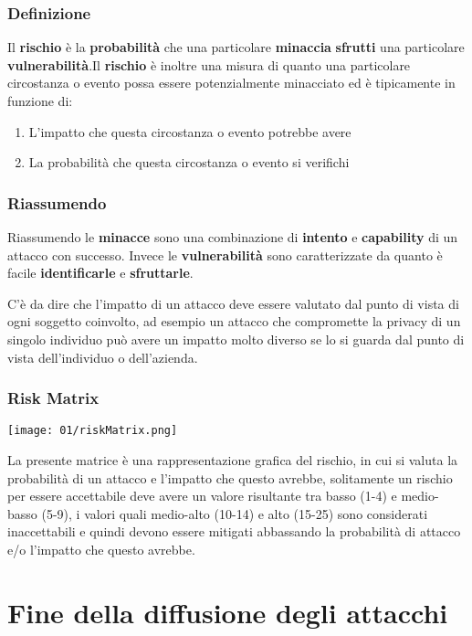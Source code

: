         \subsubsection{Definizione}
            Il \textbf{rischio} è la \textbf{probabilità} che una particolare \textbf{minaccia} \textbf{sfrutti} una particolare \textbf{vulnerabilità}.Il \textbf{rischio} è inoltre una misura di quanto una particolare circostanza o evento possa essere potenzialmente minacciato ed è tipicamente in funzione di: 
            \begin{enumerate}
                \item L'impatto che questa circostanza o evento potrebbe avere
                \item La probabilità che questa circostanza o evento si verifichi
            \end{enumerate}
        \subsubsection{Riassumendo}
            Riassumendo le \textbf{minacce} sono una combinazione di \textbf{intento} e \textbf{capability} di un attacco con successo. Invece le \textbf{vulnerabilità} sono caratterizzate da quanto è facile \textbf{identificarle} e \textbf{sfruttarle}.
            
            C'è da dire che l'impatto di un attacco deve essere valutato dal punto di vista di ogni soggetto coinvolto, ad esempio un attacco che compromette la privacy di un singolo individuo può avere un impatto molto diverso se lo si guarda dal punto di vista dell'individuo o dell'azienda.
        \subsubsection{Risk Matrix}
            \texttt{[image: 01/riskMatrix.png]}
            
            La presente matrice è una rappresentazione grafica del rischio, in cui si valuta la probabilità di un attacco e l'impatto che questo avrebbe, solitamente un rischio per essere accettabile deve avere un valore risultante tra basso (1-4) e medio-basso (5-9), i valori quali medio-alto (10-14) e alto (15-25) sono considerati inaccettabili e quindi devono essere mitigati abbassando la probabilità di attacco e/o l'impatto che questo avrebbe.

\section{Fine della diffusione degli attacchi}

